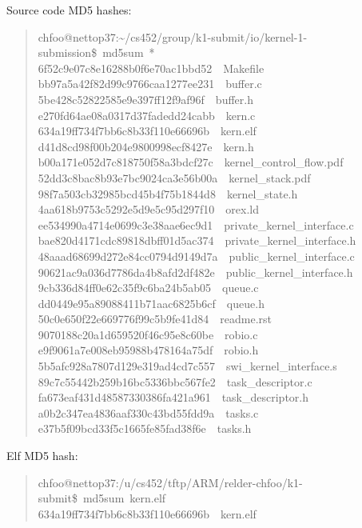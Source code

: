 \documentclass[letterpaper,12pt]{article}
\begin{document}
Source code MD5 hashes:
%
\begin{quote}{\ttfamily \raggedright \noindent
chfoo@nettop37:\textasciitilde{}/cs452/group/k1-submit/io/kernel-1-submission\$~md5sum~*\\
6f52c9e07c8e16288b0f6e70ac1bbd52~~Makefile\\
bb97a5a42f82d99c9766caa1277ee231~~buffer.c\\
5be428c52822585e9e397ff12f9af96f~~buffer.h\\
e270fd64ae08a0317d37fadedd24cabb~~kern.c\\
634a19ff734f7bb6c8b33f110e66696b~~kern.elf\\
d41d8cd98f00b204e9800998ecf8427e~~kern.h\\
b00a171e052d7c818750f58a3bdcf27c~~kernel\_control\_flow.pdf\\
52dd3c8bac8b93e7bc9024ca3e56b00a~~kernel\_stack.pdf\\
98f7a503cb32985bcd45b4f75b1844d8~~kernel\_state.h\\
4aa618b9753c5292e5d9e5c95d297f10~~orex.ld\\
ee534990a4714e0699c3e38aae6ec9d1~~private\_kernel\_interface.c\\
bae820d4171cdc89818dbff01d5ac374~~private\_kernel\_interface.h\\
48aaad68699d272e84cc0794d9149d7a~~public\_kernel\_interface.c\\
90621ac9a036d7786da4b8afd2df482e~~public\_kernel\_interface.h\\
9cb336d84ff0e62c35f9c6ba24b5ab05~~queue.c\\
dd0449e95a89088411b71aac6825b6cf~~queue.h\\
50c0e650f22e669776f99c5b9fe41d84~~readme.rst\\
9070188c20a1d659520f46c95e8c60be~~robio.c\\
e9f9061a7e008eb95988b478164a75df~~robio.h\\
5b5afc928a7807d129e319ad4cd7c557~~swi\_kernel\_interface.s\\
89c7c55442b259b16bc5336bbc567fe2~~task\_descriptor.c\\
fa673eaf431d48587330386fa421a961~~task\_descriptor.h\\
a0b2c347ea4836aaf330c43bd55fdd9a~~tasks.c\\
e37b5f09bcd33f5c1665fe85fad38f6e~~tasks.h
}
\end{quote}

Elf MD5 hash:
%
\begin{quote}{\ttfamily \raggedright \noindent
chfoo@nettop37:/u/cs452/tftp/ARM/relder-chfoo/k1-submit\$~md5sum~kern.elf\\
634a19ff734f7bb6c8b33f110e66696b~~kern.elf
}
\end{quote}
\end{document}
